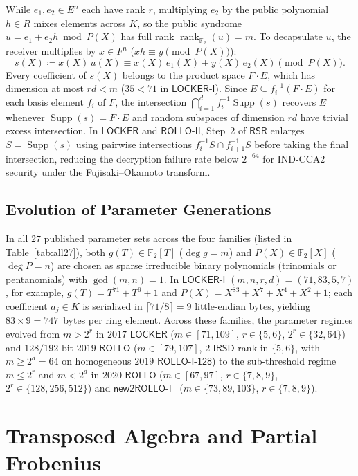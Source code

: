 \documentclass[11pt,a4paper]{article}
\theoremstyle{definition}
\theoremstyle{remark}
\newcommand{\Ftwo}{\mathbb{F}_2}
\newcommand{\Supp}{\operatorname{Supp}}
\newcommand{\rk}{\operatorname{rank}}
\newcommand{\RSR}{\mathsf{RSR}}
\begin{document}
While $e_1, e_2 \in E^n$ each have rank $r$, multiplying $e_2$ by the public polynomial $h \in R$ mixes elements across $K$, so the public syndrome $u = e_1 + e_2 h \bmod P(X)$ has full rank $\rk_{\Ftwo}(u) = m$. To decapsulate $u$, the receiver multiplies by $x \in F^n$ ($x h \equiv y \pmod{P(X)}$):
\[
    s(X) \coloneqq x(X)\, u(X) \equiv x(X)\, e_1(X) + y(X)\, e_2(X) \pmod{P(X)}.
\]
Every coefficient of $s(X)$ belongs to the product space $F \cdot E$, which has dimension at most $r d < m$ ($35 < 71$ in $\mathsf{LOCKER\text{-}I}$). Since $E \subseteq f_i^{-1}(F \cdot E)$ for each basis element $f_i$ of $F$, the intersection $\bigcap_{i=1}^d f_i^{-1}\Supp(s)$ recovers $E$ whenever $\Supp(s) = F \cdot E$ and random subspaces of dimension $r d$ have trivial excess intersection. In $\mathsf{LOCKER}$ and $\mathsf{ROLLO\text{-}II}$, Step~2 of $\RSR$ enlarges $S = \Supp(s)$ using pairwise intersections $f_i^{-1}S \cap f_{i+1}^{-1}S$ before taking the final intersection, reducing the decryption failure rate below $2^{-64}$ for IND-CCA2 security under the Fujisaki--Okamoto transform.

\subsection{Evolution of Parameter Generations}
In all $27$ published parameter sets across the four families (listed in Table~\ref{tab:all27}), both $g(T) \in \Ftwo[T]$ ($\deg g = m$) and $P(X) \in \Ftwo[X]$ ($\deg P = n$) are chosen as sparse irreducible binary polynomials (trinomials or pentanomials) with $\gcd(m, n) = 1$. In $\mathsf{LOCKER\text{-}I}$ $(m, n, r, d) = (71, 83, 5, 7)$, for example, $g(T) = T^{71} + T^6 + 1$ and $P(X) = X^{83} + X^7 + X^4 + X^2 + 1$; each coefficient $a_j \in K$ is serialized in $\lceil 71/8 \rceil = 9$ little-endian bytes, yielding $83 \times 9 = 747$~bytes per ring element. Across these families, the parameter regimes evolved from $m > 2^r$ in $2017$ $\mathsf{LOCKER}$ ($m \in [71, 109]$, $r \in \{5, 6\}$, $2^r \in \{32, 64\}$) and $128/192$-bit $2019$ $\mathsf{ROLLO}$ ($m \in [79, 107]$, $2\text{-}\mathsf{IRSD}$ rank in $\{5, 6\}$, with $m \ge 2^d = 64$ on homogeneous $2019$ $\mathsf{ROLLO\text{-}I\text{-}128}$) to the sub-threshold regime $m \le 2^r$ and $m < 2^d$ in $2020$ $\mathsf{ROLLO}$ ($m \in [67, 97]$, $r \in \{7, 8, 9\}$, $2^r \in \{128, 256, 512\}$) and $\mathsf{new2ROLLO\text{-}I}$~\cite{BBC+20} ($m \in \{73, 89, 103\}$, $r \in \{7, 8, 9\}$).

\section{Transposed Algebra and Partial Frobenius}
\label{sec:transpose}
\end{document}
